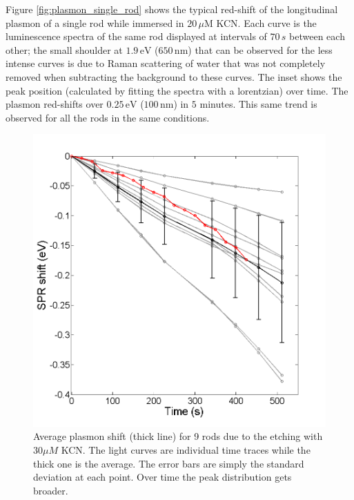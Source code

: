 \documentclass{article}
\begin{document}
Figure \ref{fig:plasmon_single_rod} shows the typical red-shift of the
longitudinal plasmon of a single rod while immersed in $20\,\mu\textrm{M}$ KCN.
Each curve is the luminescence spectra of the same rod displayed at intervals of
$70\,s$ between each other; the small shoulder at $1.9\,\textrm{eV}$
($650\,\textrm{nm}$) that can be observed for the less intense curves is due to
Raman scattering of water that was not completely removed when subtracting the
background to these curves. The inset shows the peak position (calculated by
fitting the spectra with a lorentzian) over time. The plasmon red-shifts over
$0.25\,\textrm{eV}$ ($100\,\textrm{nm}$) in $5$ minutes. This same trend is
observed for all the rods in the same conditions.

\begin{figure}[p]
 \centering
 \includegraphics[width=0.95\linewidth]{plasmon_average.png}
 \caption{Average plasmon shift (thick line) for 9 rods due to the etching with
 $30\mu M$ KCN. The light curves are individual time traces while the thick one
 is the average. The error bars are simply the standard deviation at each point. Over
 time the peak distribution gets broader.}
 \label{fig:plasmon_average}
\end{figure}
\end{document}
